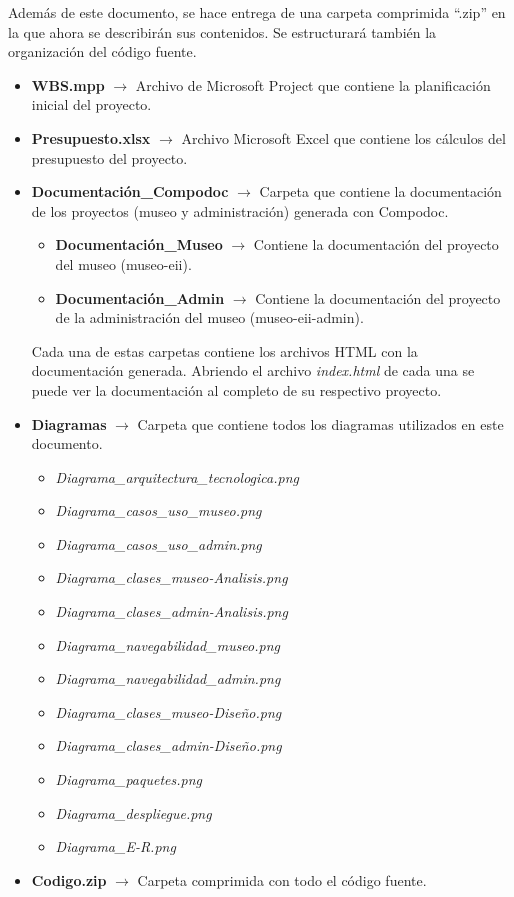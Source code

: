 Además de este documento, se hace entrega de una carpeta comprimida ``.zip'' en la que ahora se describirán sus contenidos. Se estructurará también la organización del código fuente.
\begin{itemize}
	\item \textbf{WBS.mpp} \(\rightarrow\) Archivo de Microsoft Project que contiene la planificación inicial del proyecto.
	\item \textbf{Presupuesto.xlsx} \(\rightarrow\) Archivo Microsoft Excel que contiene los cálculos del presupuesto del proyecto.
	\item \textbf{Documentación\_Compodoc} \(\rightarrow\) Carpeta que contiene la documentación de los proyectos (museo y administración) generada con Compodoc.
	\begin{itemize}
		\item \textbf{Documentación\_Museo} \(\rightarrow\) Contiene la documentación del proyecto del museo (museo-eii).
		\item \textbf{Documentación\_Admin} \(\rightarrow\) Contiene la documentación del proyecto de la administración del museo (museo-eii-admin).
	\end{itemize}
 	Cada una de estas carpetas contiene los archivos HTML con la documentación generada. Abriendo el archivo \textit{index.html} de cada una se puede ver la documentación al completo de su respectivo proyecto.
	\item \textbf{Diagramas} \(\rightarrow\) Carpeta que contiene todos los diagramas utilizados en este documento.
	\begin{itemize}
		\item \textit{Diagrama\_arquitectura\_tecnologica.png}
		\item \textit{Diagrama\_casos\_uso\_museo.png}
		\item \textit{Diagrama\_casos\_uso\_admin.png}
		\item \textit{Diagrama\_clases\_museo-Analisis.png}
		\item \textit{Diagrama\_clases\_admin-Analisis.png}
		\item \textit{Diagrama\_navegabilidad\_museo.png}
		\item \textit{Diagrama\_navegabilidad\_admin.png}
		\item \textit{Diagrama\_clases\_museo-Diseño.png}
		\item \textit{Diagrama\_clases\_admin-Diseño.png}
		\item \textit{Diagrama\_paquetes.png}
		\item \textit{Diagrama\_despliegue.png}
		\item \textit{Diagrama\_E-R.png}
	\end{itemize}
	\item \textbf{Codigo.zip} \(\rightarrow\) Carpeta comprimida con todo el código fuente.
\end{itemize}

